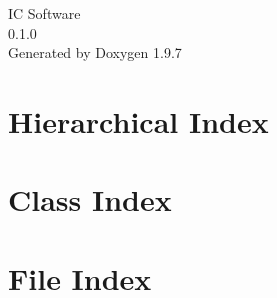 \documentclass[twoside]{book}
\newcommand{\+}{\discretionary{\mbox{\scriptsize$\hookleftarrow$}}{}{}}
\newcommand{\clearemptydoublepage}{%
    \newpage{\pagestyle{empty}\cleardoublepage}%
  }
\begin{document}
  \raggedbottom
    \hypersetup{pageanchor=false,
                bookmarksnumbered=true,
                pdfencoding=unicode
               }
  \begin{titlepage}
  \vspace*{7cm}
  \begin{center}%
  {\Large IC Software}\\
  [1ex]\large 0.\+1.\+0 \\
  \vspace*{1cm}
  {\large Generated by Doxygen 1.9.7}\\
  \end{center}
  \end{titlepage}
  \clearemptydoublepage
  \tableofcontents
  \clearemptydoublepage
  \hypersetup{pageanchor=true}
\chapter{Hierarchical Index}

\chapter{Class Index}

\chapter{File Index}

\end{document}
